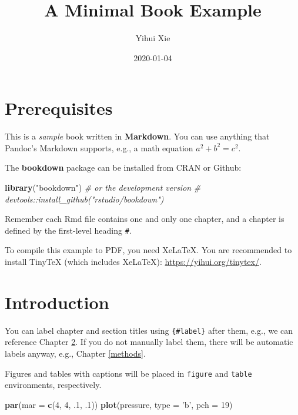 \documentclass[
]{book}
\title{A Minimal Book Example}
\author{Yihui Xie}
\date{2020-01-04}
\newenvironment{Shaded}{\begin{snugshade}}{\end{snugshade}}
\newcommand{\CommentTok}[1]{\textcolor[rgb]{0.56,0.35,0.01}{\textit{#1}}}
\newcommand{\DataTypeTok}[1]{\textcolor[rgb]{0.13,0.29,0.53}{#1}}
\newcommand{\DecValTok}[1]{\textcolor[rgb]{0.00,0.00,0.81}{#1}}
\newcommand{\FloatTok}[1]{\textcolor[rgb]{0.00,0.00,0.81}{#1}}
\newcommand{\KeywordTok}[1]{\textcolor[rgb]{0.13,0.29,0.53}{\textbf{#1}}}
\newcommand{\NormalTok}[1]{#1}
\newcommand{\StringTok}[1]{\textcolor[rgb]{0.31,0.60,0.02}{#1}}
\begin{document}
\maketitle

{
\setcounter{tocdepth}{1}
\tableofcontents
}
\hypertarget{prerequisites}{%
\chapter{Prerequisites}\label{prerequisites}}

This is a \emph{sample} book written in \textbf{Markdown}. You can use anything that Pandoc's Markdown supports, e.g., a math equation \(a^2 + b^2 = c^2\).

The \textbf{bookdown} package can be installed from CRAN or Github:

\begin{Shaded}
\begin{Highlighting}[]
\KeywordTok{library}\NormalTok{(}\StringTok{"bookdown"}\NormalTok{)}
\CommentTok{# or the development version}
\CommentTok{# devtools::install_github("rstudio/bookdown")}
\end{Highlighting}
\end{Shaded}

Remember each Rmd file contains one and only one chapter, and a chapter is defined by the first-level heading \texttt{\#}.

To compile this example to PDF, you need XeLaTeX. You are recommended to install TinyTeX (which includes XeLaTeX): \url{https://yihui.org/tinytex/}.

\hypertarget{intro}{%
\chapter{Introduction}\label{intro}}

You can label chapter and section titles using \texttt{\{\#label\}} after them, e.g., we can reference Chapter \ref{intro}. If you do not manually label them, there will be automatic labels anyway, e.g., Chapter \ref{methods}.

Figures and tables with captions will be placed in \texttt{figure} and \texttt{table} environments, respectively.

\begin{Shaded}
\begin{Highlighting}[]
\KeywordTok{par}\NormalTok{(}\DataTypeTok{mar =} \KeywordTok{c}\NormalTok{(}\DecValTok{4}\NormalTok{, }\DecValTok{4}\NormalTok{, }\FloatTok{.1}\NormalTok{, }\FloatTok{.1}\NormalTok{))}
\KeywordTok{plot}\NormalTok{(pressure, }\DataTypeTok{type =} \StringTok{'b'}\NormalTok{, }\DataTypeTok{pch =} \DecValTok{19}\NormalTok{)}
\end{Highlighting}
\end{Shaded}
\end{document}
